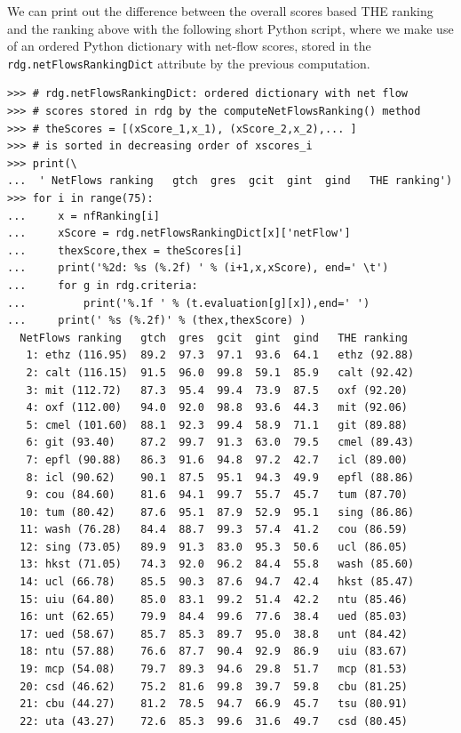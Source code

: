 We can print out the difference between the overall scores based THE ranking and the \NetFlows ranking above with the following short Python script, where we make use of an ordered Python dictionary with net-flow scores, stored in the \texttt{rdg.netFlowsRankingDict} attribute by the previous computation.
\begin{lstlisting}[caption={Comparing the robust \NetFlows ranking with the THE ranking},label=list:13.11,basicstyle=\ttfamily\scriptsize]
>>> # rdg.netFlowsRankingDict: ordered dictionary with net flow
>>> # scores stored in rdg by the computeNetFlowsRanking() method
>>> # theScores = [(xScore_1,x_1), (xScore_2,x_2),... ]
>>> # is sorted in decreasing order of xscores_i
>>> print(\
...  ' NetFlows ranking   gtch  gres  gcit  gint  gind   THE ranking')
>>> for i in range(75):
...     x = nfRanking[i]
...     xScore = rdg.netFlowsRankingDict[x]['netFlow']
...     thexScore,thex = theScores[i]
...     print('%2d: %s (%.2f) ' % (i+1,x,xScore), end=' \t')
...     for g in rdg.criteria:
...         print('%.1f ' % (t.evaluation[g][x]),end=' ')
...     print(' %s (%.2f)' % (thex,thexScore) )  
  NetFlows ranking   gtch  gres  gcit  gint  gind   THE ranking
   1: ethz (116.95)  89.2  97.3  97.1  93.6  64.1   ethz (92.88)
   2: calt (116.15)  91.5  96.0  99.8  59.1  85.9   calt (92.42)
   3: mit (112.72)   87.3  95.4  99.4  73.9  87.5   oxf (92.20)
   4: oxf (112.00)   94.0  92.0  98.8  93.6  44.3   mit (92.06)
   5: cmel (101.60)  88.1  92.3  99.4  58.9  71.1   git (89.88)
   6: git (93.40)    87.2  99.7  91.3  63.0  79.5   cmel (89.43)
   7: epfl (90.88)   86.3  91.6  94.8  97.2  42.7   icl (89.00)
   8: icl (90.62)    90.1  87.5  95.1  94.3  49.9   epfl (88.86)
   9: cou (84.60)    81.6  94.1  99.7  55.7  45.7   tum (87.70)
  10: tum (80.42)    87.6  95.1  87.9  52.9  95.1   sing (86.86)
  11: wash (76.28)   84.4  88.7  99.3  57.4  41.2   cou (86.59)
  12: sing (73.05)   89.9  91.3  83.0  95.3  50.6   ucl (86.05)
  13: hkst (71.05)   74.3  92.0  96.2  84.4  55.8   wash (85.60)
  14: ucl (66.78)    85.5  90.3  87.6  94.7  42.4   hkst (85.47)
  15: uiu (64.80)    85.0  83.1  99.2  51.4  42.2   ntu (85.46)
  16: unt (62.65)    79.9  84.4  99.6  77.6  38.4   ued (85.03)
  17: ued (58.67)    85.7  85.3  89.7  95.0  38.8   unt (84.42)
  18: ntu (57.88)    76.6  87.7  90.4  92.9  86.9   uiu (83.67)
  19: mcp (54.08)    79.7  89.3  94.6  29.8  51.7   mcp (81.53)
  20: csd (46.62)    75.2  81.6  99.8  39.7  59.8   cbu (81.25)
  21: cbu (44.27)    81.2  78.5  94.7  66.9  45.7   tsu (80.91)
  22: uta (43.27)    72.6  85.3  99.6  31.6  49.7   csd (80.45)

\end{lstlisting}
